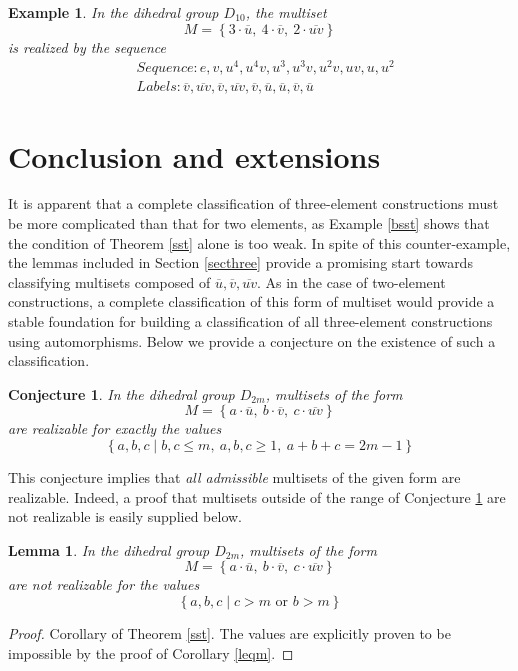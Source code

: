 \documentclass[12pt]{article}
\newtheorem{lem}[thm]{Lemma}
\newtheorem{conj}[thm]{Conjecture}
\newtheorem{exa}[thm]{Example}
\newcommand{\ba}{\[\begin{aligned}}
\newcommand{\ea}{\end{aligned}\]}
\newcommand{\setof}[1]{\left\{#1\right\}}
\newcommand{\setdef}[2]{\left\{#1\mid#2\right\}}
\newcommand{\ol}[1]{\overline{#1}} %
\begin{document}
\begin{exa}
  In the dihedral group $D_{10}$, the multiset
  $$M = \setof{ 3 \cdot \ol{u},\ 4 \cdot \ol{v},\ 2 \cdot \ol{uv}}$$
  is realized by the sequence
  \ba
  &Sequence : e, v, u^4, u^4v, u^3, u^3v, u^2v, uv, u, u^2\\
  &Labels : \ol{v}, \ol{uv}, \ol{v}, \ol{uv}, \ol{v}, \ol{u}, \ol{u}, \ol{v}, \ol{u}
  \ea
\end{exa}

\section{Conclusion and extensions}
It is apparent that
a complete classification of three-element constructions must be more complicated than that
for two elements, as Example \ref{bsst} shows that the condition of Theorem \ref{sst}
alone is too weak. In spite of this counter-example, the lemmas included in Section \ref{secthree}
provide a promising start towards classifying multisets composed of $\ol{u}, \ol{v}, \ol{uv}$.
As in the case of two-element constructions, a complete classification of this form of multiset
would provide a stable foundation for building a classification of all three-element constructions
using automorphisms. Below we provide a conjecture on the existence of such a classification.

\begin{conj}\label{threeclass}
  In the dihedral group $D_{2m}$, multisets of the form
  $$M = \setof{a \cdot \ol{u},\ b \cdot \ol{v},\ c \cdot \ol{uv}}$$
  are realizable for exactly the values
  $$\setdef{a, b, c}{b, c \leq m,\ a, b, c \geq 1,\ a + b + c = 2m - 1}$$
\end{conj}

This conjecture implies that \textit{all admissible} multisets of the given form
are realizable. Indeed, a proof that multisets outside of the range of Conjecture \ref{threeclass}
are not realizable is easily supplied below.

\begin{lem}\label{conjnegate}
  In the dihedral group $D_{2m}$, multisets of the form
  $$M = \setof{a \cdot \ol{u},\ b \cdot \ol{v},\ c \cdot \ol{uv}}$$
  are not realizable for the values
  $$\setdef{a, b, c}{c > m \text{ or } b > m}$$
\end{lem}
\begin{proof}
  Corollary of Theorem \ref{sst}. The values are explicitly proven
  to be impossible by the proof of Corollary \ref{leqm}.
\end{proof}
\end{document}
